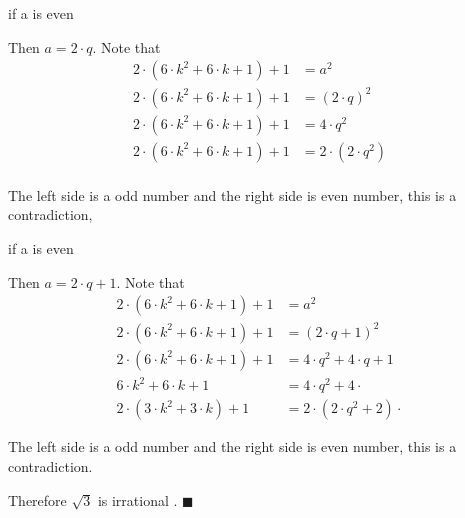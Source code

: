 \documentclass[12pt, a4paper]{article}
\begin{document}
if a is even

Then $a=2\cdot q$. Note that
\[
\begin{aligned}
     2\cdot(6 \cdot k^2 + 6 \cdot k + 1) + 1&= a^2\\
     2\cdot(6 \cdot k^2 + 6 \cdot k + 1) + 1&= (2\cdot q)^2\\
     2\cdot(6 \cdot k^2 + 6 \cdot k + 1) + 1&= 4\cdot q^2\\
     2\cdot(6 \cdot k^2 + 6 \cdot k + 1) + 1 &= 2 \cdot (2\cdot q^2)\\
\end{aligned}
\]

The left side is a odd number and the right side is even number, this is a contradiction,

if a is even

Then $a=2\cdot q+1$. Note that
\[
\begin{aligned}
     2\cdot(6 \cdot k^2 + 6 \cdot k + 1) + 1&= a^2\\
     2\cdot(6 \cdot k^2 + 6 \cdot k + 1) + 1&= (2\cdot q+1)^2\\
     2\cdot(6 \cdot k^2 + 6 \cdot k + 1) + 1&= 4\cdot q^2+4\cdot q+1\\
     6 \cdot k^2 + 6 \cdot k + 1 &= 4\cdot q^2+4\cdot\\
     2\cdot (3 \cdot k^2 + 3 \cdot k) + 1 &= 2\cdot (2\cdot q^2+2)\cdot
\end{aligned}
\]

The left side is a odd number and the right side is even number, this is a contradiction.

Therefore $\sqrt{3}$ is irrational . $\blacksquare$
\end{document}
